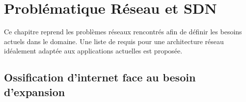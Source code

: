 \chapter{Problématique Réseau et SDN}
\label{chap-1}



Ce chapitre reprend les problèmes réseaux rencontrés afin de définir les besoins actuels dans le domaine. 
Une liste de requis pour une architecture réseau idéalement adaptée aux applications actuelles est proposée.


\section{Ossification d'internet face au besoin d'expansion}







